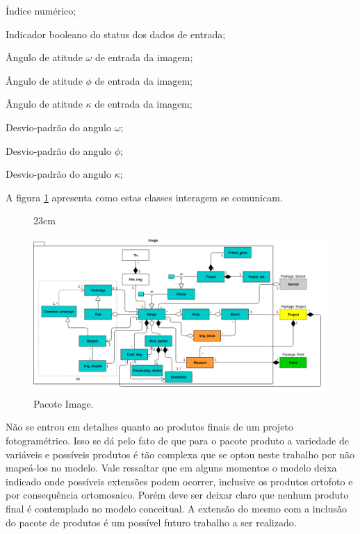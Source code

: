 \begin{description}[labelwidth=2cm, itemsep=-0.3cm]
\item [Classe Frame\_ins]
\item[Id:] Índice numérico;
\item[Status:] Indicador booleano do status dos dados de entrada;
\item[Omega:] Ângulo de atitude $\omega$ de entrada da imagem;
\item[Phi:] Ângulo de atitude $\phi$ de entrada da imagem;
\item[Kappa:] Ângulo de atitude $\kappa$ de entrada da imagem;
\item[S\_omega:] Desvio-padrão do angulo $\omega$;
\item[S\_phi:] Desvio-padrão do angulo $\phi$;
\item[S\_kappa:] Desvio-padrão do angulo $\kappa$;
\end{description}

A figura \ref{pack_img} apresenta como estas classes interagem se comunicam.

\begin{landscape}
\begin{figure}[ht]{23cm}
  \caption{Pacote Image.} \label{pack_img}
  \includegraphics[width=\hsize]{figuras/package_img.png}
\end{figure}
\end{landscape}

Não se entrou em detalhes quanto ao produtos finais de um projeto fotogramétrico. Isso se dá pelo fato de que para o pacote produto a variedade de variáveis e possíveis produtos é tão complexa que se optou neste trabalho por não mapeá-los no modelo. Vale ressaltar que em alguns momentos o modelo deixa indicado onde possíveis extensões podem ocorrer, inclusive os produtos ortofoto e por consequência ortomosaico. Porém deve ser deixar claro que nenhum produto final é contemplado no modelo conceitual. A extensão do mesmo com a inclusão do pacote de produtos é um possível futuro trabalho a ser realizado.

